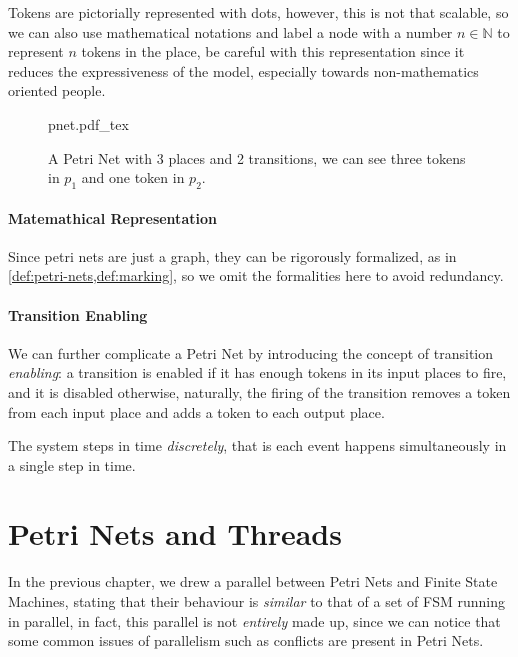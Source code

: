 \documentclass[openright, twoside, twocolumn]{report}
\newcommand{\incsvg}[2]{%
	\def\svgwidth{\columnwidth}
	{#2.pdf_tex}%
}
\begin{document}
    Tokens are pictorially represented with dots, however, this is not that scalable, so we can also use mathematical
    notations and label a node with a number $n \in \mathbb{N}$ to represent $n$ tokens in the place, be careful with
    this representation since it reduces the expressiveness of the model, especially towards non-mathematics oriented
    people.

    \begin{figure}[ht]
      \centering
      \incsvg{fig}{pnet}\\
      \label{fig:pnet}
      \caption{%
        A Petri Net with 3 places and 2 transitions, we can
        see three tokens in $p_1$ and one token in $p_2$.
      }
    \end{figure}

    \paragraph{Matemathical Representation}
    Since petri nets are just a graph, they can be rigorously formalized, as in \cref{def:petri-nets,def:marking}, so we omit
    the formalities here to avoid redundancy.

    \paragraph{Transition Enabling}

    We can further complicate a Petri Net by introducing the concept of transition \emph{enabling}: a transition
    is enabled if it has enough tokens in its input places to fire, and it is disabled otherwise, naturally,
    the firing of the transition removes a token from each input place and adds a token to each output place.

    The system steps in time \emph{discretely}, that is each event happens simultaneously in a single step in
    time.

    \section{Petri Nets and Threads}

    In the previous chapter, we drew a parallel between Petri Nets and Finite State Machines, stating that their behaviour is \emph{similar} to that of a set of FSM running in parallel, in fact, this parallel is not \emph{entirely} made up, since we can notice that some common issues of parallelism such as conflicts are present in Petri Nets.
\end{document}
